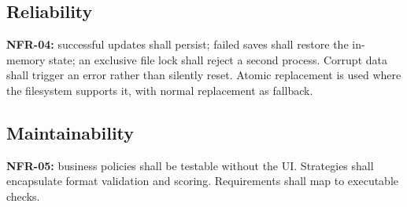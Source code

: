 \documentclass[12pt]{article}
\begin{document}
\subsection{Reliability}
\textbf{NFR-04:} successful updates shall persist; failed saves shall restore the in-memory state; an exclusive file lock shall reject a second process. Corrupt data shall trigger an error rather than silently reset. Atomic replacement is used where the filesystem supports it, with normal replacement as fallback.
\subsection{Maintainability}
\textbf{NFR-05:} business policies shall be testable without the UI. Strategies shall encapsulate format validation and scoring. Requirements shall map to executable checks.
\end{document}
